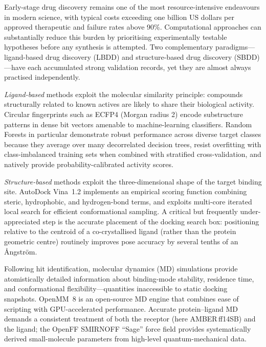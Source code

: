 \documentclass[journal=jcisd8,manuscript=article]{achemso}
\begin{document}
Early-stage drug discovery remains one of the most resource-intensive
endeavours in modern science, with typical costs exceeding one billion
US dollars per approved therapeutic and failure rates above
90\%.\cite{dimasi2016innovation,wouters2020estimated}  Computational
approaches can substantially reduce this burden by prioritising
experimentally testable hypotheses before any synthesis is
attempted.\cite{kitchen2004docking,sliwoski2014computational}
Two complementary paradigms---ligand-based drug discovery (LBDD) and
structure-based drug discovery (SBDD)---have each accumulated strong
validation records, yet they are almost always practised
independently.\cite{hughes2011principles}

\textit{Ligand-based} methods exploit the molecular similarity principle:
compounds structurally related to known actives are likely to share their
biological activity.\cite{johnson1990concepts}  Circular fingerprints such
as ECFP4 (Morgan radius 2) encode substructure patterns in dense bit
vectors amenable to machine-learning classifiers.\cite{rogers2010extended}
Random Forests in particular demonstrate robust performance across diverse
target classes because they average over many decorrelated decision trees,
resist overfitting with class-imbalanced training sets when combined with
stratified cross-validation, and natively provide probability-calibrated
activity scores.\cite{breiman2001random,svetnik2003random}

\textit{Structure-based} methods exploit the three-dimensional shape of the
target binding site.  AutoDock Vina~1.2 implements an empirical scoring
function combining steric, hydrophobic, and hydrogen-bond terms, and exploits
multi-core iterated local search for efficient conformational
sampling.\cite{trott2010autodock,eberhardt2021autodock}  A critical but
frequently under-appreciated step is the accurate placement of the docking
search box: positioning relative to the centroid of a co-crystallised ligand
(rather than the protein geometric centre) routinely improves pose accuracy
by several tenths of an \AA{}ngstr\"{o}m.\cite{forli2016computational}

Following hit identification, molecular dynamics (MD) simulations provide
atomistically detailed information about binding-mode stability, residence
time, and conformational flexibility---quantities inaccessible to static
docking snapshots.\cite{chodera2011markov}  OpenMM~8 is an open-source MD
engine that combines ease of scripting with GPU-accelerated
performance.\cite{eastman2017openmm,eastman2024openmm8}  Accurate
protein--ligand MD demands a consistent treatment of both the receptor (here
AMBER\,ff14SB)\cite{maier2015ff14sb} and the ligand; the OpenFF SMIRNOFF
``Sage'' force field provides systematically derived small-molecule parameters
from high-level quantum-mechanical data.\cite{qiu2021forcefield}
\end{document}
